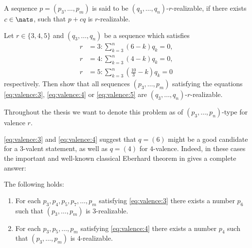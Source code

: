\begin{definition}\label{def:eberhard:realizable}
  A sequence $p = (p_3, \dots, p_m)$ is said to be $(q_3, \dots, q_n)$-$r$-realizable, if there exists $c \in \nats$, such that $p + c q$ is $r$-realizable.
\end{definition}
\begin{problem}\label{problem:eberhard}
  Let $r \in \{3, 4, 5\}$ and $(q_3, \dots, q_n)$ be a sequence which satisfies
  \begin{align}
    r &= 3: \sum_{k=3}^n \left( 6            - k \right) q_k = 0 \label{eq:zero:curv:3},\\
    r &= 4: \sum_{k=3}^n \left( 4            - k \right) q_k = 0 \label{eq:zero:curv:4},\\
    r &= 5: \sum_{k=3}^n \left( \frac{10}{3} - k \right) q_k = 0 \label{eq:zero:curv:5}
  \end{align}
  respectively. Then show that all sequences $(p_3, \dots, p_m)$ satisfying the equations \ref{eq:valence:3}, \ref{eq:valence:4} or \ref{eq:valence:5} are $(q_3, \dots, q_n)$-$r$-realizable.
\end{problem}
\begin{notation}
  Throughout the thesis we want to denote this problem as of $(p_3, \dots, p_n)$-type for valence $r$.
\end{notation}
\autoref{eq:valence:3} and \autoref{eq:valence:4} suggest that $q = (6)$ might be a good candidate for a $3$-valent statement, as well as $q = (4)$ for $4$-valence. Indeed, in these cases the important and well-known classical Eberhard theorem in \cite{ConvexPolytopes} gives a complete answer:
\renewcommand{\Itemautorefname}{Theorem \ref{thm:eberhard}}
\begin{theorem} \label{thm:eberhard} The following holds:
  \begin{enumerate}[label=(\roman*)]
  \item \label{thm:eberhard:3} For each $p_3, p_4, p_5, p_7, \dots, p_m$ satisfying \autoref{eq:valence:3} there exists a number $p_6$ such that $(p_3, \dots, p_m)$ is $3$-realizable.
  \item \label{thm:eberhard:4} For each $p_3, p_5, \dots, p_m$ satisfying \autoref{eq:valence:4} there exists a number $p_4$ such that $(p_3, \dots, p_m)$ is $4$-realizable.
  \end{enumerate}
\end{theorem}

